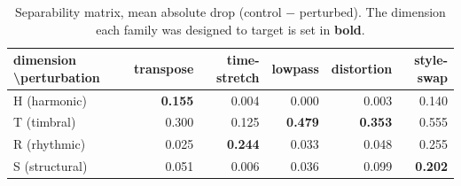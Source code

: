 \begin{table}[t]
\centering
\caption[The separability matrix]{Separability matrix, mean absolute drop (control $-$ perturbed). The dimension each family was designed to target is set in \textbf{bold}.}
\label{tab:separability}
\begin{tabular}{lrrrrr}
\toprule
dimension \textbackslash  perturbation & transpose & time-stretch & lowpass & distortion & style-swap \\
\midrule
H (harmonic) & \textbf{0.155} & 0.004 & 0.000 & 0.003 & 0.140 \\
T (timbral) & 0.300 & 0.125 & \textbf{0.479} & \textbf{0.353} & 0.555 \\
R (rhythmic) & 0.025 & \textbf{0.244} & 0.033 & 0.048 & 0.255 \\
S (structural) & 0.051 & 0.006 & 0.036 & 0.099 & \textbf{0.202} \\
\bottomrule
\end{tabular}
\end{table}
